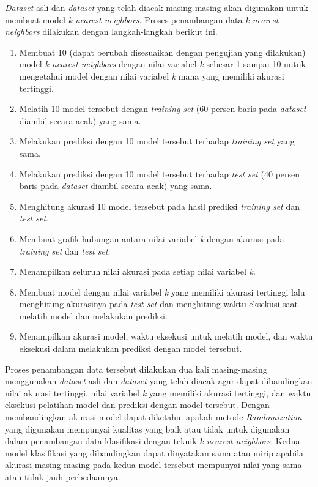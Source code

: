 \textit{Dataset} asli dan \textit{dataset} yang telah diacak masing-masing akan digunakan untuk membuat model \textit{k-nearest neighbors}. Proses penambangan data \textit{k-nearest neighbors} dilakukan dengan langkah-langkah berikut ini.
\begin{enumerate}
    \item Membuat 10 (dapat berubah disesuaikan dengan pengujian yang dilakukan) model \textit{k-nearest neighbors} dengan nilai variabel \textit{k} sebesar 1 sampai 10 untuk mengetahui model dengan nilai variabel \textit{k} mana yang memiliki akurasi tertinggi.
    \item Melatih 10 model tersebut dengan \textit{training set} (60 persen baris pada \textit{dataset} diambil secara acak) yang sama.
    \item Melakukan prediksi dengan 10 model tersebut terhadap \textit{training set} yang sama.
    \item Melakukan prediksi dengan 10 model tersebut terhadap \textit{test set} (40 persen baris pada \textit{dataset} diambil secara acak) yang sama.
    \item Menghitung akurasi 10 model tersebut pada hasil prediksi \textit{training set} dan \textit{test set}.
    \item Membuat grafik hubungan antara nilai variabel \textit{k} dengan akurasi pada \textit{training set} dan \textit{test set}.
    \item Menampilkan seluruh nilai akurasi pada setiap nilai variabel \textit{k}.
    \item Membuat model dengan nilai variabel \textit{k} yang memiliki akurasi tertinggi lalu menghitung akurasinya pada \textit{test set} dan menghitung waktu eksekusi saat melatih model dan melakukan prediksi.
    \item Menampilkan akurasi model, waktu eksekusi untuk melatih model, dan waktu eksekusi dalam melakukan prediksi dengan model tersebut.
\end{enumerate}
Proses penambangan data tersebut dilakukan dua kali masing-masing menggunakan \textit{dataset} asli dan \textit{dataset} yang telah diacak agar dapat dibandingkan nilai akurasi tertinggi, nilai variabel \textit{k} yang memiliki akurasi tertinggi, dan waktu eksekusi pelatihan model dan prediksi dengan model tersebut. Dengan membandingkan akurasi model dapat diketahui apakah metode \textit{Randomization} yang digunakan mempunyai kualitas yang baik atau tidak untuk digunakan dalam penambangan data klasifikasi dengan teknik \textit{k-nearest neighbors}. Kedua model klasifikasi yang dibandingkan dapat dinyatakan sama atau mirip apabila akurasi masing-masing pada kedua model tersebut mempunyai nilai yang sama atau tidak jauh perbedaannya.

